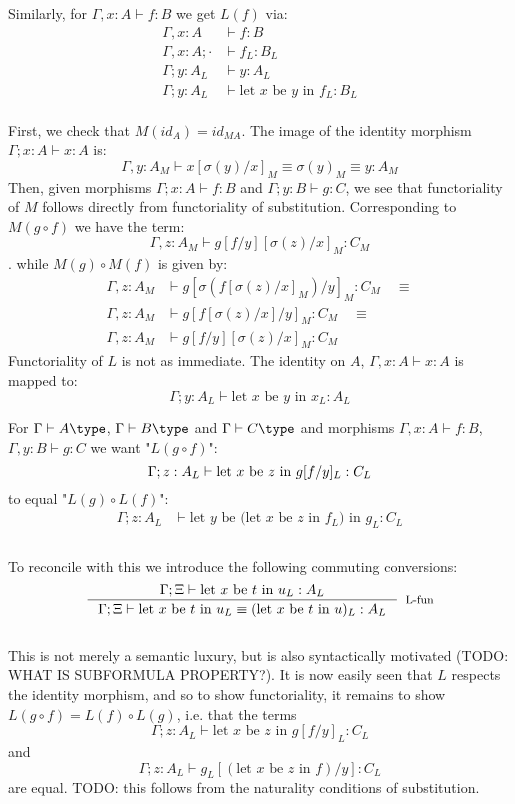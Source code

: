 Similarly, for $\Gamma, x : A \vdash f : B$ we get $L(f)$ via:
\[
  \begin{split}
    \Gamma, x : A &\vdash f : B\\
    \Gamma, x : A; \cdot &\vdash f_L : B_L\\
    \Gamma; y : A_L &\vdash y : A_L\\
    \Gamma; y : A_L &\vdash \text{let $x$ be $y$ in $f_L$} : B_L
  \end{split}
\]\\
First, we check that $M(id_A) = id_{MA}$.  The image of the identity morphism $\Gamma; x : A \vdash x : A$ is:
\[
  \Gamma, y : A_M \vdash x[\sigma(y)/x]_M \equiv \sigma(y)_M \equiv y : A_M
\]
Then, given morphisms $\Gamma; x : A \vdash f : B$ and $\Gamma; y : B \vdash g : C$, we see that functoriality of $M$ follows directly from functoriality of substitution. Corresponding to $M(g \circ f)$ we have the term:
\[
\Gamma, z : A_M \vdash g[f/y][\sigma(z)/x]_M : C_M
\].
while $M(g) \circ M(f)$ is given by:
\[
  \begin{split}
    \Gamma, z : A_M &\vdash g[\sigma(f[\sigma(z)/x]_M)/y]_M : C_M \quad \equiv\\
    \Gamma, z : A_M &\vdash g[f[\sigma(z)/x]/y]_M : C_M \quad \equiv\\
    \Gamma, z : A_M &\vdash g[f/y][\sigma(z)/x]_M : C_M
  \end{split}
\]
Functoriality of $L$ is not as immediate. The identity on $A$, $\Gamma, x : A \vdash x : A$ is mapped to:
\[
  \Gamma; y : A_L \vdash \text{let $x$ be $y$ in $x_L$} : A_L
\]



For $\Gamma \vdash A \type$, $\Gamma \vdash B \type$ and $\Gamma \vdash C \type$ and morphisms $\Gamma, x : A \vdash f : B$, $\Gamma, y : B \vdash g : C$ we want "$L(g \circ f)$":
\[
  \Gamma; z : A_L \vdash \text{let $x$ be $z$ in $g[f/y]_L$} : C_L\\
\]
to equal "$L(g) \circ L(f)$":
\[
  \begin{split}
    \Gamma; z : A_L &\vdash \text{let $y$ be (let $x$ be $z$ in $f_L$) in $g_L$} : C_L\\
  \end{split}
\]\\
To reconcile with this we introduce the following commuting conversions:
\[
\inference{\Gamma; \Xi \vdash \text{let $x$ be $t$ in $u_L$} : A_L}{\Gamma; \Xi \vdash \text{let $x$ be $t$ in $u_L$} \equiv (\text{let $x$ be $t$ in $u$})_L : A_L}[L-fun]
\]\\
This is not merely a semantic luxury, but is also syntactically motivated (TODO: WHAT IS SUBFORMULA PROPERTY?). It is now easily seen that $L$ respects the identity morphism, and so to show functoriality, it remains to show $L(g \circ f) = L(f) \circ L(g)$, i.e. that the terms
\[
  \Gamma; z : A_L \vdash \text{let $x$ be $z$ in }g[f/y]_L : C_L
\]
and
\[
  \Gamma; z : A_L \vdash g_L[(\text{let $x$ be $z$ in }f)/y] : C_L
\]
are equal. TODO: this follows from the naturality conditions of substitution.

